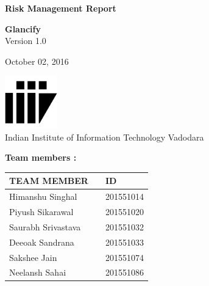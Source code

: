 \documentclass[12pt]{article}
\renewcommand{\today}{October 02, 2016}
\begin{document}
\begin{titlepage}
        \begin{center}
           
           
            \LARGE{\textbf{Risk Management Report}}
           
            \vspace{1.5cm}
           
            \textbf{Glancify}\\
           
            \small{Version 1.0}
            \vspace{2cm}
         
           
           
            \vspace{1.5cm}
           
            \today
           
            \vspace{5cm}
            \includegraphics[width=0.17\textwidth]{iiitv.png} \\
            \Large{Indian Institute of Information Technology Vadodara} \\
           
        \end{center}
    \end{titlepage}
\newpage
\textbf{Team members :} \\
\begin{center}
	\begin{tabular}{ |m{10em} m{8em} m{9em}|}
		\hline
		TEAM MEMBER        &   & ID        \\
		\hline
		Himanshu Singhal             &   & 201551014 \\
		Piyush Sikarawal          &   & 201551020 \\
		Saurabh Srivastava              &   & 201551032 \\
	    Deeoak Sandrana     &   & 201551033 \\
		Sakshee Jain    &   & 201551074 \\
		Neelansh Sahai    &   & 201551086 \\ 
		\hline
	\end{tabular}
	
\end{center}
\newpage
\tableofcontents
	\newpage
\end{document}
